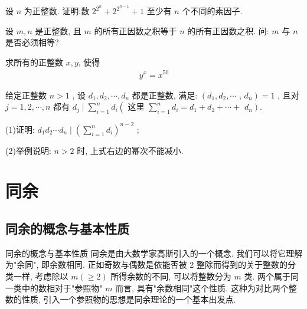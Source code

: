 \documentclass[aspectratio=169]{ctexbeamer}
\theoremstyle{definition}
\begin{document}
\begin{frame}[t]
	\begin{example}
		设 $n$ 为正整数. 证明:数 $2^{2^{n}}+2^{2^{n-1}}+1$ 至少有 $n$ 个不同的素因子.
	\end{example}
\end{frame}

\begin{frame}[t]
	\begin{example}
		设 $m ,  n$ 是正整数, 且 $m$ 的所有正因数之积等于 $n$ 的所有正因数之积. 问: $m$ 与 $n$ 是否必须相等?
	\end{example}
\end{frame}

\begin{frame}[t]
	\begin{example}
		求所有的正整数 $x, y$, 使得
		\begin{align*}
			y^{x}=x^{50}
		\end{align*}
	\end{example}
\end{frame}

\begin{frame}[t]
	\begin{example}
		给定正整数 $n>1$ , 设 $d_{1}, d_{2}, \cdots, d_{n}$ 都是正整数, 满足:  $\left(d_{1}, d_{2}, \cdots\right.$ ,  $\left.d_{n}\right)=1$ , 且对 $j=1,2, \cdots, n$ 都有 $d_{j} \mid \sum_{i=1}^{n} d_{i}\left(\right.$ 这里 $\sum_{i=1}^{n} d_{i}=d_{1}+d_{2}+\cdots+$ $\left.d_{n}\right)$.

		(1)证明: $d_{1} d_{2} \cdots d_{n} \mid\left(\sum_{i=1}^{n} d_{i}\right)^{n-2}$ ;

		(2)举例说明:  $n>2$ 时, 上式右边的幂次不能减小.
	\end{example}
\end{frame}

\section{同余}
\subsection{同余的概念与基本性质}\setcounter{theorem}{0}
\begin{frame}{同余的概念与基本性质}
	同余是由大数学家高斯引入的一个概念. 我们可以将它理解为"余同", 即余数相同. 正如奇数与偶数是依能否被 2 整除而得到的关于整数的分类一样, 考虑除以 $m(\geqslant 2)$ 所得余数的不同, 可以将整数分为 $m$ 类. 两个属于同一类中的数相对于"参照物" $m$ 而言, 具有"余数相同"这个性质. 这种为对比两个整数的性质, 引入一个参照物的思想是同余理论的一个基本出发点.
\end{frame}
\end{document}
